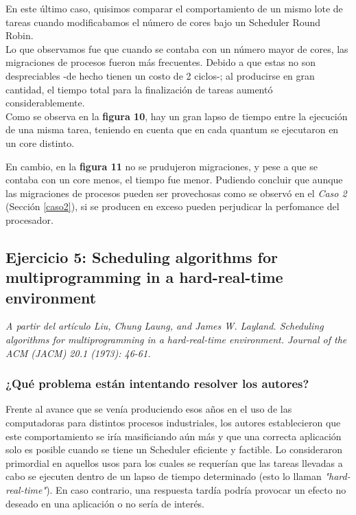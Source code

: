 \documentclass[a4paper]{article}
\begin{document}
\bigskip 

En este último caso, quisimos comparar el comportamiento de un mismo lote de tareas cuando modificabamos el número de cores bajo un Scheduler Round Robin.\\

 Lo que observamos fue que cuando se contaba con un número mayor de cores, las migraciones de procesos fueron m\'as frecuentes. Debido a que estas no son despreciables -de hecho tienen un costo de 2 ciclos-; al producirse en gran cantidad, el tiempo total para la finalización de tareas aumentó considerablemente. \\
 
 Como se observa en la \textbf{figura 10}, hay un gran lapso de tiempo entre la ejecución de una misma tarea, teniendo en cuenta que en cada quantum se ejecutaron en un core distinto. 
 
 En cambio, en la \textbf{figura 11} no se prudujeron migraciones, y pese a que se contaba con un core menos, el tiempo fue menor. Pudiendo concluir que aunque las migraciones de procesos pueden ser provechosas como se observó en el \emph{Caso 2} (Secci\'on \ref{caso2}), si se producen en exceso pueden perjudicar la perfomance del procesador.  

\newpage

 \subsection{Ejercicio 5: Scheduling algorithms for multiprogramming in a hard-real-time environment}
 
\textit{A partir del art\'iculo Liu, Chung Laung, and James W. Layland. Scheduling algorithms for multiprogramming in a hard-real-time environment. Journal of the ACM (JACM) 20.1 (1973): 46-61.}


\subsubsection{¿Qu\'e problema est\'an intentando resolver los autores?}

Frente al avance que se ven\'ia produciendo esos años en el uso de las computadoras para distintos procesos industriales, los autores establecieron que este comportamiento se iría masificiando aún más y que una correcta aplicación solo es posible cuando se tiene un Scheduler eficiente y factible. Lo consideraron primordial en aquellos usos para los cuales se requerían que las tareas llevadas a cabo se ejecuten dentro de un lapso de tiempo determinado (esto lo llaman \textit{"hard-real-time"}). En caso contrario, una respuesta tardía podría provocar un efecto no deseado en una aplicación o no sería de interés. \\
\end{document}
